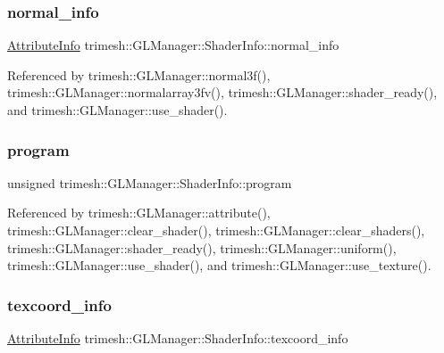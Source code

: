 \subsubsection{\texorpdfstring{normal\+\_\+info}{normal\_info}}
{\footnotesize\ttfamily \hyperlink{structtrimesh_1_1GLManager_1_1AttributeInfo}{Attribute\+Info} trimesh\+::\+G\+L\+Manager\+::\+Shader\+Info\+::normal\+\_\+info}



Referenced by trimesh\+::\+G\+L\+Manager\+::normal3f(), trimesh\+::\+G\+L\+Manager\+::normalarray3fv(), trimesh\+::\+G\+L\+Manager\+::shader\+\_\+ready(), and trimesh\+::\+G\+L\+Manager\+::use\+\_\+shader().

\mbox{\label{classtrimesh_1_1GLManager_1_1ShaderInfo_a629301935610a8fdedfe0df51e5afa98}} 
\subsubsection{\texorpdfstring{program}{program}}
{\footnotesize\ttfamily unsigned trimesh\+::\+G\+L\+Manager\+::\+Shader\+Info\+::program}



Referenced by trimesh\+::\+G\+L\+Manager\+::attribute(), trimesh\+::\+G\+L\+Manager\+::clear\+\_\+shader(), trimesh\+::\+G\+L\+Manager\+::clear\+\_\+shaders(), trimesh\+::\+G\+L\+Manager\+::shader\+\_\+ready(), trimesh\+::\+G\+L\+Manager\+::uniform(), trimesh\+::\+G\+L\+Manager\+::use\+\_\+shader(), and trimesh\+::\+G\+L\+Manager\+::use\+\_\+texture().

\mbox{\label{classtrimesh_1_1GLManager_1_1ShaderInfo_a3639b7ec779911da900bf1e037faef39}} 
\subsubsection{\texorpdfstring{texcoord\+\_\+info}{texcoord\_info}}
{\footnotesize\ttfamily \hyperlink{structtrimesh_1_1GLManager_1_1AttributeInfo}{Attribute\+Info} trimesh\+::\+G\+L\+Manager\+::\+Shader\+Info\+::texcoord\+\_\+info}



